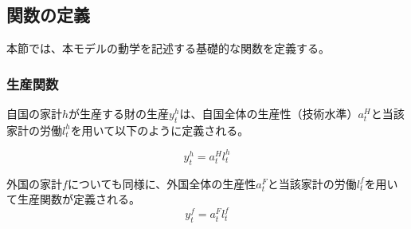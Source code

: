 
\subsection{関数の定義}
\label{sec:chapter3_definitions_functions}

本節では、本モデルの動学を記述する基礎的な関数を定義する。

\subsubsection{生産関数}
\label{sec:chapter3_definitions_functions_production}

自国の家計\(h\)が生産する財の生産\(y_t^h\)は、自国全体の生産性（技術水準）\(a_t^H\)と当該家計の労働\(l_t^h\)を用いて以下のように定義される。

\begin{equation}
\label{form:chapter3_definitions_functions_production_home}
    y_t^h=a_t^Hl_t^h
\end{equation}

外国の家計\(f\)についても同様に、外国全体の生産性\(a_t^F\)と当該家計の労働\(l_t^f\)を用いて生産関数が定義される。
\begin{equation}
\label{form:chapter3_definitions_functions_production_foreign}
    y_t^f=a_t^Fl_t^f
\end{equation}